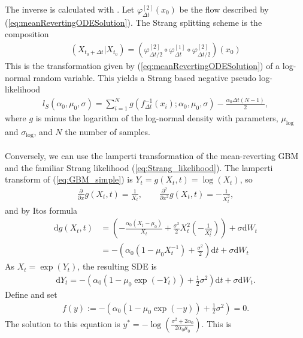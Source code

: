 The inverse is calculated with \cite[remark belown equation (9)]{SplittingSchemes}. Let $\varphi_{\Delta t}^{[2]}(x_0)$ be the flow described by (\ref{eq:meanRevertingODESolution}).
The Strang splitting scheme is the composition
\begin{align}
    \left(X_{t_0 + \Delta t} | X_{t_0}\right) = \left(\varphi_{\Delta t / 2}^{[2]}\circ \varphi_{\Delta t}^{[1]} \circ \varphi_{\Delta t / 2}^{[2]}\right)(x_0)
\end{align}
This is the transformation given by (\ref{eq:meanRevertingODESolution}) of a log-normal random variable. This yields a Strang based negative pseudo log-likelihood
\begin{align}
    l_S(\alpha_0, \mu_0, \sigma) = \sum_{i = 1}^{N} g(f_{\Delta t}^{-1}(x_i); \alpha_0,\mu_0, \sigma) - \frac{\alpha_0\Delta t(N - 1)}{2},
\end{align}
where $g$ is minus the logarithm of the log-normal density with parameters, $\mu_{\mathrm{log}}$ and $\sigma_{\mathrm{log}}$, and $N$ the number of samples.\\\\
Conversely, we can use the lamperti transformation of the mean-reverting GBM and the familiar Strang likelihood (\ref{eq:Strang_likelihood}). The lamperti transform of (\ref{eq:GBM_simple}) is $Y_t = g(X_t, t) = \log(X_t)$, so
\begin{align}
    \frac{\partial}{\partial x}g(X_t, t) = \frac{1}{X_t}, \qquad \frac{\partial^2}{\partial x^2}g(X_t, t) = -\frac{1}{X_t^2},
\end{align}
and by Itos formula
\begin{align}
    \mathrm{d}g(X_t, t) &= \left(-\frac{\alpha_0\left(X_t - \mu_0\right)}{X_t}+\frac{\sigma^2}{2}X_t^2\left(-\frac{1}{X_t^2}\right)\right) + \sigma\mathrm{d}W_t\nonumber\\
    &= -\left(\alpha_0\left(1-\mu_0X_t^{-1}\right) + \frac{\sigma^2}{2}\right)\mathrm{d}t + \sigma\mathrm{d}W_t
\end{align}
As $X_t = \exp(Y_t)$, the resulting SDE is
\begin{align}
    \mathrm{d}Y_t = -\left(\alpha_0\left(1 - \mu_0\exp(-Y_t)\right) + \frac{1}{2}\sigma^2\right)\mathrm{d}t + \sigma \mathrm{d}W_t. \label{eq:GBM_lamperti}
\end{align}
Define and set
\begin{align}
    f(y) := -\left(\alpha_0\left(1 - \mu_0\exp(-y)\right) + \frac{1}{2}\sigma^2\right) = 0.
\end{align}
The solution to this equation is $y^* = -\log\left(\frac{\sigma^2 + 2\alpha_0}{2\alpha_0\mu_0}\right)$. This is
